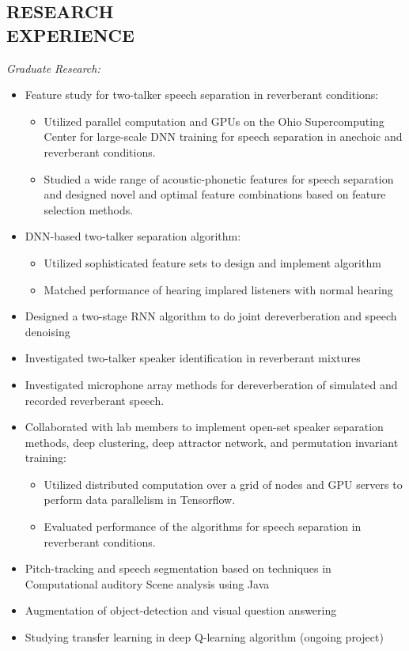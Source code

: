 \documentclass[margin, 10pt]{res}
\begin{document}
\begin{resume}
\section{RESEARCH \\ EXPERIENCE}
\textit{Graduate Research:}
\begin{itemize}
\item Feature study for two-talker speech separation in reverberant conditions:
	\begin{itemize}
	\item Utilized parallel computation and GPUs on the Ohio Supercomputing Center for large-scale DNN training for speech separation in anechoic and reverberant conditions.
	\item Studied a wide range of acoustic-phonetic features for speech separation and designed novel and optimal feature combinations based on feature selection methods.
	\end{itemize}

\item DNN-based two-talker separation algorithm:
	\begin{itemize}
	\item Utilized sophisticated feature sets to design and implement algorithm
	\item Matched performance of hearing implared listeners with normal hearing
	\end{itemize}


\item Designed a two-stage RNN algorithm to do joint dereverberation and speech denoising
\item Investigated two-talker speaker identification in reverberant mixtures
\item Investigated microphone array methods for dereverberation of simulated and recorded reverberant speech.

\item Collaborated with lab members to implement open-set speaker separation methods, deep clustering, deep attractor network, and permutation invariant training:
	\begin{itemize}
	\item Utilized distributed computation over a grid of nodes and GPU servers to perform data parallelism in Tensorflow.
	\item Evaluated performance of the algorithms for speech separation in reverberant conditions.
	\end{itemize}

\item Pitch-tracking and speech segmentation based on techniques in Computational auditory Scene analysis using Java
\item Augmentation of object-detection and visual question answering 
\item Studying transfer learning in deep Q-learning algorithm (ongoing project)


\end{itemize}
\end{resume}
\end{document}
